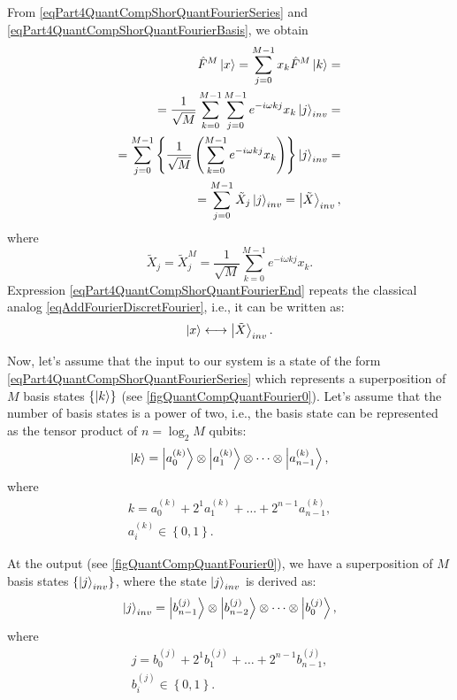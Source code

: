 From \eqref{eqPart4QuantCompShorQuantFourierSeries} and \eqref{eqPart4QuantCompShorQuantFourierBasis}, we obtain
\begin{eqnarray}
\hat{F}^{M}\ket{x} = \sum_{j = 0}^{M - 1}x_k \hat{F}^{M} \ket{k} = 
\nonumber \\
= \frac{1}{\sqrt{M}}\sum_{k = 0}^{M -1}\sum_{j = 0}^{M - 1} e^{-i \omega k j}x_k\ket{j}_{inv} = 
\nonumber \\
= \sum_{j = 0}^{M - 1} \left\{\frac{1}{\sqrt{M}}\left( \sum_{k = 0}^{M - 1}e^{-i \omega k j} x_k
\right)\right\}\ket{j}_{inv} = 
\nonumber \\
= \sum_{j = 0}^{M - 1}\tilde{X}_j\ket{j}_{inv} = \left|\tilde{X}\right>_{inv},
\nonumber
\end{eqnarray}
where 
\begin{equation}
\tilde{X}_j = \tilde{X}_j^{M} = 
\frac{1}{\sqrt{M}}\sum_{k = 0}^{M - 1}e^{-i \omega k j} x_k.
\label{eqPart4QuantCompShorQuantFourierEnd}
\end{equation}
Expression \eqref{eqPart4QuantCompShorQuantFourierEnd} repeats the classical analog \eqref{eqAddFourierDiscretFourier}, i.e., it can be written as:
\[
 \ket{x} \longleftrightarrow \left|\tilde{X}\right>_{inv}.
\]



Now, let's assume that the input to our system is a state of the form \eqref{eqPart4QuantCompShorQuantFourierSeries} which represents a superposition of $M$ basis states $\left\{\ket{k}\right\}$ (see \autoref{figQuantCompQuantFourier0}). Let's assume that the number of basis states is a power of two, i.e., the basis state can be represented as the tensor product of $n = \log_2{M}$ qubits:
\begin{equation}
\ket{k} = \ket{a^{(k)}_0} \otimes  \ket{a^{(k)}_1} \otimes \cdots \otimes \ket{a^{(k)}_{n-1}}, 
\nonumber
\end{equation}
where
\begin{eqnarray}
k = a^{(k)}_0 + 2^1 a^{(k)}_1 + \dots + 2^{n-1} a^{(k)}_{n-1},
\nonumber \\
a^{(k)}_i \in \left\{0, 1\right\}.
\nonumber
\end{eqnarray}

At the output (see \autoref{figQuantCompQuantFourier0}), we have a superposition of $M$ basis states $\left\{\ket{j}_{inv}\right\}$, where the state $\ket{j}_{inv}$ is derived as:
\begin{equation}
\ket{j}_{inv} = \ket{b^{(j)}_{n-1}} \otimes \ket{b^{(j)}_{n-2}} \otimes \cdots \otimes \ket{b^{(j)}_{0}}, 
\nonumber
\end{equation}
where
\begin{eqnarray}
j = b^{(j)}_0 + 2^1 b^{(j)}_1 + \dots + 2^{n-1} b^{(j)}_{n-1},
\nonumber \\
b^{(j)}_i \in \left\{0, 1\right\}.
\nonumber
\end{eqnarray}

